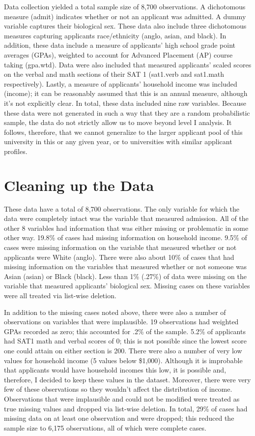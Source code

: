 \documentclass[titlepage]{article}   	%
\begin{document}
Data collection yielded a total sample size of 8,700 observations. A dichotomous measure (admit) indicates whether or not an applicant was admitted. A dummy variable captures their biological sex. These data also include three dichotomous measures capturing applicants race/ethnicity (anglo, asian, and black). In addition, these data include a measure of applicants’ high school grade point averages (GPAs), weighted to account for Advanced Placement (AP) course taking (gpa.wtd). Data were also included that measured applicants’ scaled scores on the verbal and math sections of their SAT 1 (sat1.verb and sat1.math respectively). Lastly, a measure of applicants’ household income was included (income); it can be reasonably assumed that this is an annual measure, although it’s not explicitly clear. In total, these data included nine raw variables. Because these data were not generated in such a way that they are a random probabilistic sample, the data do not strictly allow us to move beyond level I analysis. It follows, therefore, that we cannot generalize to the larger applicant pool of this university in this or any given year, or to universities with similar applicant profiles. 

\section{Cleaning up the Data}

These data have a total of 8,700 observations. The only variable for which the data were completely intact was the variable that measured admission. All of the other 8 variables had information that was either missing or problematic in some other way. 19.8\% of cases had missing information on household income. 9.5\% of cases were missing information on the variable that measured whether or not applicants were White (anglo). There were also about 10\% of cases that had missing information on the variables that measured whether or not someone was Asian (asian) or Black (black). Less than 1\% (.27\%) of data were missing on the variable that measured applicants’ biological sex. Missing cases on these variables were all treated via list-wise deletion. 

In addition to the missing cases noted above, there were also a number of observations on variables that were implausible. 19 observations had weighted GPAs recorded as zero; this accounted for .2\% of the sample. 5.2\% of applicants had SAT1 math and verbal scores of 0; this is not possible since the lowest score one could attain on either section is 200. There were also a number of very low values for household income (5 values below \$1,000). Although it is improbable that applicants would have household incomes this low, it is possible and, therefore, I decided to keep these values in the dataset. Moreover, there were very few of these observations so they wouldn’t affect the distribution of income. Observations that were implausible and could not be modified were treated as true missing values and dropped via list-wise deletion. In total, 29\% of cases had missing data on at least one observation and were dropped; this reduced the sample size to 6,175 observations, all of which were complete cases. 
 
\end{document}
